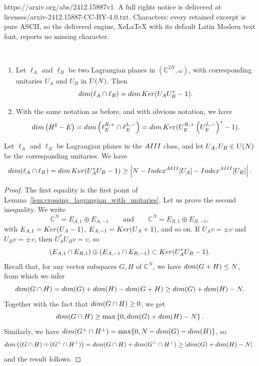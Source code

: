\documentclass[10pt,a4paper]{amsart}
\def\C{{\mathbb C}}
\def\Index{{\rm Index}}
\def\Ker{{\rm Ker }}
\def\U{{\rm U}}
\def\dim{{\rm dim }}
\def\rAIII{{\rm AIII}}
\begin{document}
https://arxiv.org/abs/2412.15887v1. A full rights notice is delivered at licenses/arxiv-2412.15887-CC-BY-4.0.txt. Characters: every retained excerpt is pure ASCII, so the delivered engine, XeLaTeX with its default Latin Modern text font, reports no missing character.
\begin{lemma} \label{lem:crossing_lagrangian_with_unitaries} ~
	\begin{enumerate}
		\item Let $\ell_A$ and $\ell_B$ be two Lagrangian planes in $(\C^{2N}, \omega)$, with corresponding unitaries $U_A$ and $U_B$ in $\U(N)$. Then
		\[
		\dim (\ell_A \cap \ell_B) = \dim \, \Ker (U_A U_B^* - 1).
		\]
		\item With the same notation as before, and with obvious notation, we have
		\[
		\dim \left( H^\sharp - E \right) = \dim \left( \ell^{R, +}_E \cap \ell^{L, -}_E \right) =  \dim \, \Ker (U_E^{R, +} \left(U_E^{L, -} \right)^* - 1).
		\]
	\end{enumerate}
\end{lemma}

\begin{lemma} \label{lem:crossing_lagrangian_AIII}
    Let $\ell_A$ and $\ell_B$ be Lagrangian planes in the $\rAIII$ class, and let $U_A, U_B \in \U(N)$ be the corresponding unitaries. We have
    \[
        \dim (\ell_A \cap \ell_B) = \dim \, \Ker (U_A^* U_B - 1) \ge \left| N - \Index^\rAIII[U_A] -  \Index^\rAIII[U_B] \right|.
    \]
\end{lemma}

\begin{proof}
    The first equality is the first point of Lemma~\ref{lem:crossing_lagrangian_with_unitaries}. Let us prove the second inequality. We write
    \[
        \C^{N} = E_{A, 1} \oplus E_{A,-1} \qquad \text{and} \qquad \C^N = E_{B, 1} \oplus E_{B, -1},
    \]
    with $E_{A, 1} = {\rm Ker}(U_A - 1)$, $E_{A, -1} = {\rm Ker}(U_A + 1)$, and so on. If $U_A v = \pm v$ and $U_B v = \pm v$, then $U_A^* U_B v = v$, so
    \[
        \left( E_{A, 1} \cap E_{B, 1} \right) \oplus \left(  E_{A, -1} \cap E_{B, -1} \right) \subset \Ker (U_A^* U_B - 1).
    \]
    Recall that, for any vector subspaces $G, H$ of $\C^N$, we have $\dim(G + H) \le N$, from which we infer 
    \[
        \dim (G \cap H) = \dim(G) + \dim(H) - \dim(G + H) \ge \dim(G) + \dim (H) - N.
    \]
    Together with the fact that $\dim(G \cap H) \ge 0$, we get
    \[
        \dim (G \cap H)  \ge \max \left\{ 0, \dim(G) + \dim (H) - N \right\}.
    \]
    Similarly, we have $\dim(G^\perp \cap H^\perp)  = \max \{ 0, N - \dim(G) - \dim(H) \}$, so
    \[
        \dim \left( ( G \cap H) \oplus (G^\perp \cap H^\perp) \right) = \dim(G \cap H) + \dim(G^\perp \cap H^\perp) \ge \left| \dim (G) + \dim(H) - N \right|.
    \]
    and the result follows.
\end{proof}
\end{document}
